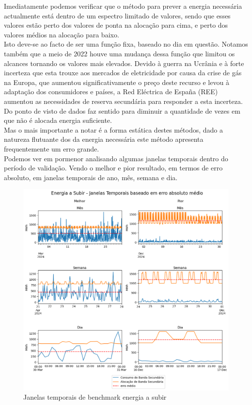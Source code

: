 Imediatamente podemos verificar que o método para prever a energia necessária actualmente está dentro de um espectro limitado de valores, sendo que esses valores estão perto dos valores de ponta na alocação para cima, e perto dos valores médios na alocação para baixo.\\
Isto deve-se ao facto de ser uma função fixa, baseado no dia em questão. Notamos também que a meio de 2022 houve uma mudança dessa função que limitou os alcances tornando os valores mais elevados. Devido à guerra na Ucrânia e à forte incerteza que esta trouxe aos mercados de eletricidade por causa da crise de gás na Europa, que aumentou significativamente o preço deste recurso e levou à adaptação dos consumidores e países, a Red Eléctrica de España (\gls{REE}) aumentou as necessidades de reserva secundária para responder a esta incerteza.\\
Do ponto de visto de dados faz sentido para diminuir a quantidade  de vezes em que não é alocada energia suficiente.\\
Mas o mais importante a notar é a forma estática destes métodos, dado a natureza flutuante dos da energia necessária este método apresenta frequentemente um erro grande.\\
Podemos ver em pormenor analisando algumas janelas temporais dentro do período de validação. Vendo o melhor e pior resultado, em termos de erro absoluto, em janelas temporais de ano, mês, semana e dia.\\


\begin{figure}[H]
    \centering
    \includegraphics[width=\textwidth]{plots/alocacoes_temporais_upward_dataset.png}
    \caption{Janelas temporais de benchmark energia a subir}
    \label{fig:benchmarktimewindowsup}
\end{figure}


